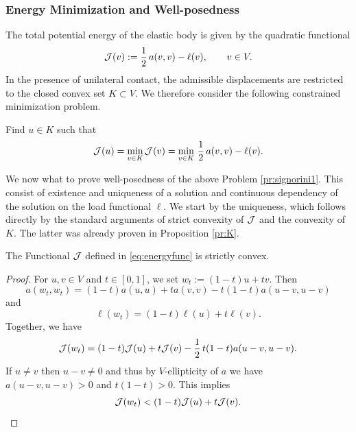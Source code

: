 \subsubsection{Energy Minimization and Well-posedness}

The total potential energy of the elastic body is given by the quadratic functional
\begin{equation}\label{eq:energyfunc}
	{\mathcal J}(v):=\frac{1}{2}\,a(v,v)-\ell(v),\qquad v\in V.
\end{equation}
In the presence of unilateral contact, the admissible displacements are restricted to the closed convex set $K\subset V$. We therefore consider the following constrained minimization problem.
\begin{problem}\label{pr:signorini1}
Find $u\in K$ such that
\begin{equation*}
	{\mathcal J}(u)=\min_{v\in K}{\mathcal J}(v) = \min_{v\in K}\,\frac{1}{2}\,a(v,v)-\ell(v).
\end{equation*}
\end{problem}

We now what to prove well-posedness of the above Problem \ref{pr:signorini1}. This consist of existence and uniqueness of a solution and continuous dependency of the solution on the load functional $\ell$. We start by the uniqueness, which follows directly by the standard arguments of strict convexity of ${\mathcal J}$ and the convexity of $K$. The latter was already proven in Proposition \ref{pr:K}.

\begin{lemma}\label{lem:Jconvex}
	The Functional ${\mathcal J}$ defined in \eqref{eq:energyfunc} is strictly convex.
\end{lemma}
\begin{proof}
	For $u,v\in V$ and $t\in[0,1]$, we set $w_t:=(1-t)u+tv$. Then
	\begin{equation*}
		a(w_t,w_t) = (1-t)a(u,u)+ta(v,v)-t(1-t)a(u-v,u-v)
	\end{equation*}
	and
	\begin{equation*}
		\ell(w_t) = (1-t)\ell(u)+t\ell(v).
	\end{equation*}
	Together, we have
	\begin{equation*}
		{\mathcal J}(w_t) = (1-t){\mathcal J}(u)+t{\mathcal J}(v)-\frac{1}{2}\,t(1-t)a(u-v,u-v).
	\end{equation*}
	If $u\neq v$ then $u-v\neq 0$ and thus by $V$-ellipticity of $a$ we have $a(u-v,u-v)>0$ and $t(1-t)>0$. This implies
	\begin{equation*}
		{\mathcal J}(w_t)<(1-t){\mathcal J}(u)+t{\mathcal J}(v).
	\end{equation*}
\end{proof}

